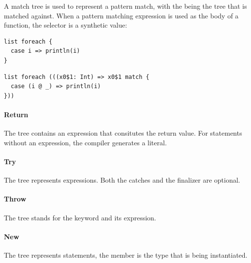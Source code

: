 \noindent A match tree is used to represent a pattern match, with the  being the tree that is matched against. When a pattern matching expression is used as the body of a function, the selector is a synthetic value:

\begin{multicols}{2}
\begin{lstlisting}
list foreach {
  case i => println(i)
}
\end{lstlisting}
\begin{lstlisting}
list foreach (((x0$1: Int) => x0$1 match {
  case (i @ _) => println(i)
}))
\end{lstlisting}
\end{multicols}

\paragraph{Return} 

\noindent The  tree contains an expression that consitutes the return value. For  statements without an expression, the compiler generates a \src{()} literal.

\paragraph{Try} 

\noindent The  tree represents  expressions. Both the catches and the finalizer are optional.

\paragraph{Throw} 

\noindent The  tree stands for the  keyword and its expression.

\paragraph{New} 

\noindent The  tree represents  statements, the  member is the type that is being instantiated.

